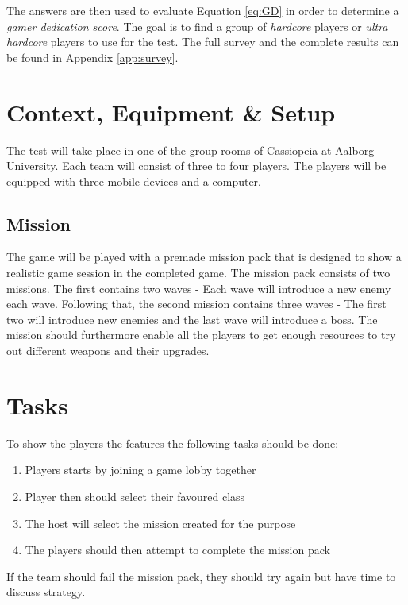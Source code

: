 The answers are then used to evaluate Equation \ref{eq:GD} in order to determine a \emph{gamer dedication score}.
The goal is to find a group of \emph{hardcore} players or \emph{ultra hardcore} players to use for the test.
The full survey and the complete results can be found in Appendix \ref{app:survey}.

\section{Context, Equipment \& Setup}
The test will take place in one of the group rooms of Cassiopeia at Aalborg University.
Each team will consist of three to four players.
The players will be equipped with three mobile devices and a computer.

\subsection{Mission}
The game will be played with a premade mission pack that is designed to show a realistic game session in the completed game.
The mission pack consists of two missions.
The first contains two waves - Each wave will introduce a new enemy each wave.
Following that, the second mission contains three waves - The first two will introduce new enemies and the last wave will introduce a boss.
The mission should furthermore enable all the players to get enough resources to try out different weapons and their upgrades.

\section{Tasks}
To show the players the features the following tasks should be done:
\begin{enumerate}
	\item Players starts by joining a game lobby together
	\item Player then should select their favoured class
	\item The host will select the mission created for the purpose
	\item The players should then attempt to complete the mission pack
\end{enumerate}
If the team should fail the mission pack, they should try again but have time to discuss strategy.

